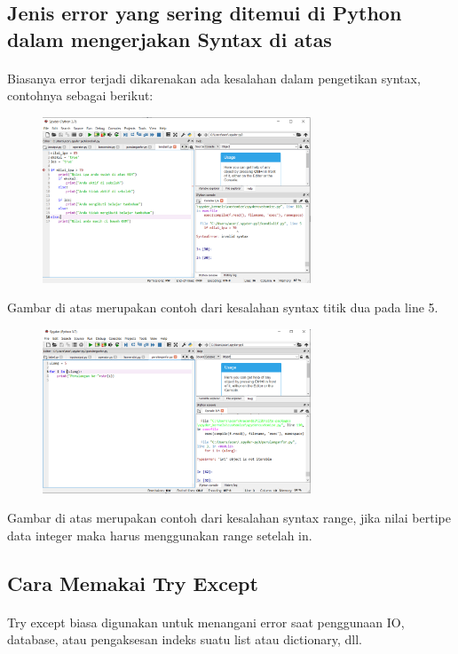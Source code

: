 \subsection{Jenis error yang sering ditemui di Python dalam mengerjakan Syntax di atas}
\paragraph{}
        Biasanya error terjadi dikarenakan ada kesalahan dalam pengetikan syntax, contohnya sebagai berikut:
        \begin{figure}[h]
        \centerline{\includegraphics[width=8cm]{figures/errortitikdua.PNG}}
        \end{figure}
        \par Gambar di atas merupakan contoh dari kesalahan syntax titik dua pada line 5.
        \begin{figure}[h]
        \centerline{\includegraphics[width=8cm]{figures/range.PNG}}
        \end{figure}
        \par Gambar di atas merupakan contoh dari kesalahan syntax range, jika nilai bertipe data integer maka harus menggunakan range setelah in.

\subsection{Cara Memakai Try Except}
\paragraph{}
        Try except biasa digunakan untuk menangani error saat penggunaan IO, database, atau pengaksesan indeks suatu list atau dictionary, dll.
